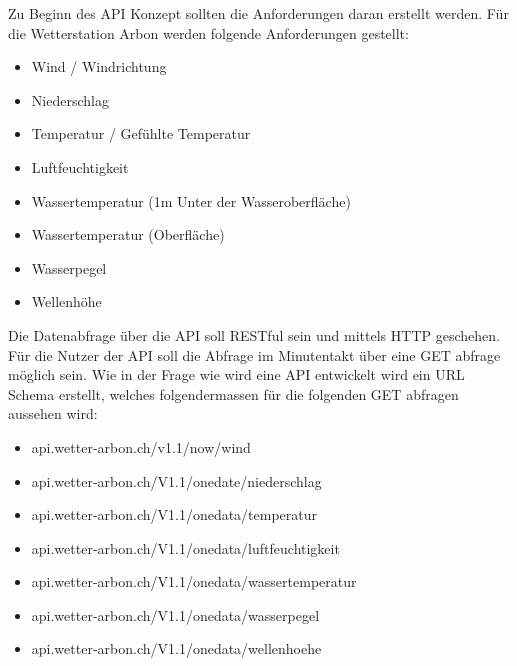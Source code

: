 Zu Beginn des API Konzept sollten die Anforderungen daran erstellt werden. Für die Wetterstation Arbon werden folgende Anforderungen gestellt:
\begin{itemize}
\item Wind / Windrichtung
\item Niederschlag
\item Temperatur / Gefühlte Temperatur
\item Luftfeuchtigkeit
\item Wassertemperatur (1m Unter der Wasseroberfläche)
\item Wassertemperatur (Oberfläche)
\item Wasserpegel
\item Wellenhöhe
\end{itemize}
Die Datenabfrage über die API soll RESTful sein und mittels HTTP geschehen. Für die Nutzer der API soll die Abfrage im Minutentakt über eine GET abfrage möglich sein. Wie in der Frage wie wird eine API entwickelt wird ein URL Schema erstellt, welches folgendermassen für die folgenden GET abfragen aussehen wird:
\begin{itemize}
\item api.wetter-arbon.ch/v1.1/now/wind
\item api.wetter-arbon.ch/V1.1/onedate/niederschlag
\item api.wetter-arbon.ch/V1.1/onedata/temperatur
\item api.wetter-arbon.ch/V1.1/onedata/luftfeuchtigkeit
\item api.wetter-arbon.ch/V1.1/onedata/wassertemperatur
\item api.wetter-arbon.ch/V1.1/onedata/wasserpegel
\item api.wetter-arbon.ch/V1.1/onedata/wellenhoehe

\end{itemize}

